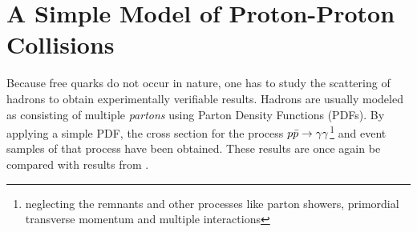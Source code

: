 \chapter{A Simple Model of Proton-Proton Collisions}%
\label{chap:pdf}

Because free quarks do not occur in nature, one has to study the
scattering of hadrons to obtain experimentally verifiable
results. Hadrons are usually modeled as consisting of multiple
\emph{partons} using Parton Density Functions (PDFs). By applying a
simple PDF, the cross section for the process
\(p\bar{p}\rightarrow\gamma\gamma\)\footnote{neglecting the remnants and other processes like
  parton showers, primordial transverse momentum and multiple
  interactions} and event samples of that process have been
obtained. These results are once again be compared with results from
\sherpa.

